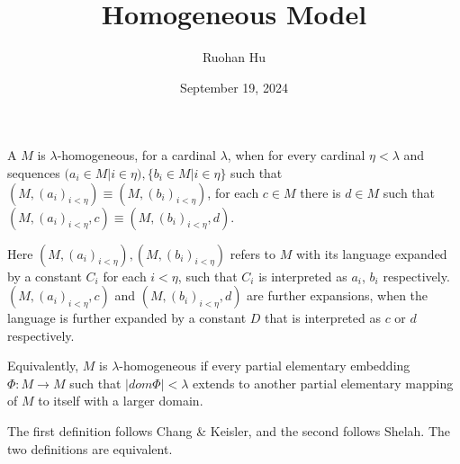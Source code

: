 \documentclass[a4paper]{article}
\title{Homogeneous Model}
\date{September 19, 2024}
\author{Ruohan Hu}
\begin{document}
\maketitle
\par{
    A  \(M\) is \(\lambda\)-homogeneous, for a cardinal \(\lambda\), 
    when for every cardinal \(\eta < \lambda\) and sequences \((a_i \in  M|i \in \eta ), \{ b_i \in  M|i \in \eta \}\) such that \((M,(a_i)_{i< \eta }) \equiv (M,(b_i)_{i< \eta })\), 
    for each \(c \in  M\) there is \(d \in  M\) such that \((M,(a_i)_{i< \eta },c) \equiv (M,(b_i)_{i< \eta },d)\). 

    Here \((M,(a_i)_{i< \eta }),(M,(b_i)_{i< \eta })\) refers to \(M\) with its language expanded by a constant \(C_i\) for each \(i< \eta\), such that \(C_i\) is interpreted as \(a_i\), \(b_i\) respectively. 
    \((M,(a_i)_{i< \eta },c)\) and \((M,(b_i)_{i< \eta },d)\) are further expansions, when the language is further expanded by a constant \(D\) that is interpreted as \(c\) or \(d\) respectively.

    Equivalently, \(M\) is \(\lambda\)-homogeneous if every partial elementary embedding \(\Phi :M \to  M\) such that \(|dom \Phi |< \lambda\) extends to another partial elementary mapping of \(M\) to itself with a larger domain.

    The first definition follows Chang & Keisler, and the second follows Shelah. The two definitions are equivalent.
}
\printbibliography
\end{document}
